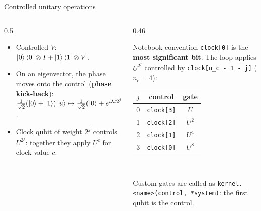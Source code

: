 \documentclass[aspectratio=169,11pt]{beamer}
\newcommand{\key}[1]{{\color{qdark}\textbf{#1}}}
\begin{document}
\begin{frame}{Controlled unitary operations}
  \begin{columns}[T]
    \begin{column}{0.5\textwidth}
      \small
      \begin{itemize}
        \item Controlled-$V$: $\ket0\bra0\otimes I + \ket1\bra1\otimes V$.
        \item On an eigenvector, the phase moves onto the control (\key{phase kick-back}):
          $\frac{1}{\sqrt2}(\ket0 + \ket1)\ket u \mapsto \frac{1}{\sqrt2}(\ket0 + e^{i\lambda t2^j}\ket1)\ket u$.
        \item Clock qubit of weight $2^j$ controls $U^{2^j}$: together they apply $U^c$ for clock value $c$.
      \end{itemize}
    \end{column}
    \begin{column}{0.46\textwidth}
      \begin{block}{Notebook convention}
        \footnotesize
        \texttt{clock[0]} is the \key{most significant bit}. The loop applies $U^{2^j}$ controlled by
        \texttt{clock[n\_c - 1 - j]} ($n_c = 4$):\\[1mm]
        \centering
        \begin{tabular}{ccc}
          \toprule $j$ & control & gate\\ \midrule
          0 & \texttt{clock[3]} & $U$\\ 1 & \texttt{clock[2]} & $U^2$\\ 2 & \texttt{clock[1]} & $U^4$\\ 3 & \texttt{clock[0]} & $U^8$\\ \bottomrule
        \end{tabular}\\[1mm]
        \raggedright Custom gates are called as \texttt{kernel.<name>(control, *system)}: the first qubit is the control.
      \end{block}
    \end{column}
  \end{columns}
\end{frame}
\end{document}
